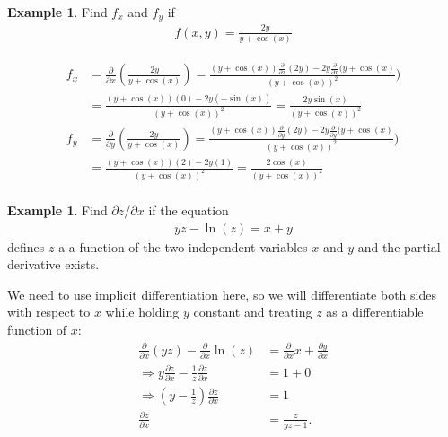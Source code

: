 \documentclass[12pt, letter]{article}
\theoremstyle{plain}
\numberwithin{theorem}{section}
\theoremstyle{definition}
\newtheorem{example}[theorem]{Example}
\begin{document}
\begin{example}
Find $f_x$ and $f_y$ if
\begin{align*}
f(x,y) = \frac{2y}{y+\cos(x)}
\end{align*}

\smallskip

\begin{align*}
f_x &= \frac{\partial}{\partial x} \left(\frac{2y}{y+\cos(x)}\right) = \frac{(y+\cos(x))\frac{\partial}{\partial x}(2y)-2y\frac{\partial}{\partial x}(y+\cos(x)}{(y+\cos(x))^2})\\
&=\frac{(y+\cos(x))(0)-2y(-\sin(x))}{(y+\cos(x))^2} = \frac{2y\sin(x)}{(y+\cos(x))^2}\\
f_y &= \frac{\partial}{\partial y} \left(\frac{2y}{y+\cos(x)}\right) = \frac{(y+\cos(x))\frac{\partial}{\partial y}(2y)-2y\frac{\partial}{\partial y}(y+\cos(x)}{(y+\cos(x))^2})\\
&=\frac{(y+\cos(x))(2)-2y(1)}{(y+\cos(x))^2} = \frac{2\cos(x)}{(y+\cos(x))^2}\\
\end{align*}
\end{example}

\bigskip

\hrulefill

\bigskip

\begin{example}
Find $\partial z / \partial x$ if the equation
\begin{align*}
yz-\ln(z) = x+y
\end{align*}
defines $z$ a a function of the two independent variables $x$ and $y$ and the partial derivative exists.

\smallskip

We need to use implicit differentiation here, so we will differentiate both sides with respect to $x$ while holding $y$ constant and treating $z$ as a differentiable function of $x$:
\begin{align*}
\frac{\partial}{\partial x} (yz) - \frac{\partial}{\partial x} \ln(z) &= \frac{\partial}{\partial x} x + \frac{\partial y}{\partial x}\\
\Rightarrow y \frac{\partial z}{\partial x} - \frac{1}{z} \frac{\partial z}{\partial x} &= 1+0\\
\Rightarrow \left(y-\frac{1}{z}\right) \frac{\partial z}{\partial x} &= 1\\
\frac{\partial z}{\partial x} &= \frac{z}{yz-1}.
\end{align*}
\end{example}
\end{document}
